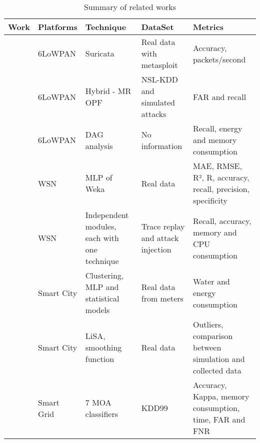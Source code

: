 \begin{table*}[htb]
\caption{Summary of related works}
\centering
\begin{scriptsize}
\begin{tabularx}{\textwidth}{l|l|X|X|X}
Work                                         & Platforms    & Technique & DataSet & Metrics\\\hline\hline
\cite{dos-6lowpan-iot}                       & 6LoWPAN      & Suricata & Real data with metasploit & Accuracy, packets/second\\\hline
\cite{Hybrid-ids-arch-iot}                   & 6LoWPAN      & Hybrid - MR OPF & NSL-KDD and simulated attacks & FAR and recall\\\hline
\cite{SVELTE}                                & 6LoWPAN      & DAG analysis & No information & Recall, energy and memory consumption\\\hline
\cite{Fault-tolerance-disaster}              & WSN          & MLP of Weka & Real data & MAE, RMSE, R², R, accuracy, recall, precision, specificity\\\hline
\cite{Kalis}                                 & WSN          & Independent modules, each with one technique & Trace replay and attack injection & Recall, accuracy, memory and CPU consumption\\\hline
\cite{IoT-arch-smartmeter}                   & Smart City   & Clustering, MLP and statistical models & Real data from meters & Water and energy consumption\\\hline
\cite{scalable-anomaly-detection-smart-city} & Smart City   & LiSA, smoothing function & Real data & Outliers, comparison between simulation and collected data\\\hline
\cite{DS-based-IDS-SmartGrid}                & Smart Grid   & 7 MOA classifiers & KDD99 & Accuracy, Kappa, memory consumption, time, FAR and FNR \\\hline
\end{tabularx}
\label{tab:summary}
\end{scriptsize}
\end{table*}

